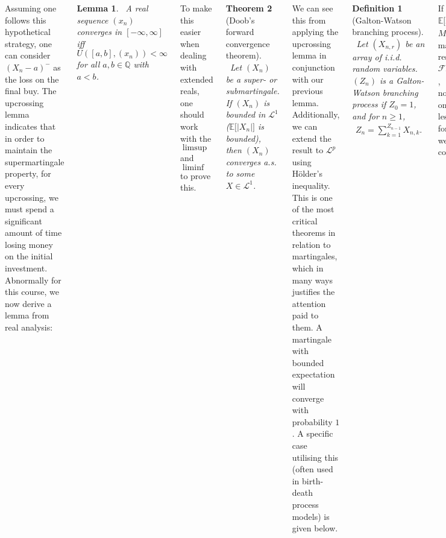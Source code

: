 \documentclass{tikzposter} %
\newtheorem{theorem}{Theorem}
\newtheorem{lemma}[theorem]{Lemma}
\newtheorem{definition}{Definition}
\begin{document}
\begin{columns}
{    Assuming one follows this hypothetical strategy, one can consider $(X_{n}-a)^{-}$ as the loss on the final buy. The upcrossing lemma indicates that in order to maintain the supermartingale property, for every upcrossing, we must spend a significant amount of time losing money on the initial investment. \\

    Abnormally for this course, we now derive a lemma from real analysis:
    \begin{lemma}
    \ A real sequence $(x_{n})$ converges in $[-\infty,\infty]$ iff $U([a,b],(x_{n})) < \infty$ for all $a,b \in \mathbb{Q}$ with $a < b$.
    \end{lemma}
    \hphantom{}

    To make this easier when dealing with extended reals, one should work with the $\limsup$ and $\liminf$ to prove this. \\

    \begin{theorem}[Doob's forward convergence theorem]
    \ Let $(X_{n})$ be a super- or submartingale. If $(X_{n})$ is bounded in $\mathcal{L}^{1}$ ($\mathbb{E}\big[|X_{n}|\big]$ is bounded), then $(X_{n})$ converges a.s. to some $X \in \mathcal{L}^{1}$.
    \end{theorem}
    \hphantom{}

    We can see this from applying the upcrossing lemma in conjunction with our previous lemma. Additionally, we can extend the result to $\mathcal{L}^{p}$ using H\"{o}lder's inequality. \\

    This is one of the most critical theorems in relation to martingales, which in many ways justifies the attention paid to them. A martingale with bounded expectation will converge with probability $1$. A specific case utilising this (often used in birth-death process models) is given below. \\

    \begin{definition}[Galton-Watson branching process]
    \ Let $(X_{n,r})$ be an array of i.i.d. random variables. $(Z_{n})$ is a Galton-Watson branching process if $Z_{0} = 1$, and for $n \ge 1$,
    \begin{align*}
      Z_{n} = \sum_{k=1}^{Z_{n-1}} X_{n,k}.
    \end{align*}
    \end{definition}
    \hphantom{}

    If each $X_{n,r}$ is integrable, and $\mathbb{E}\big[X_{0,0}\big] = \mu \neq 0$, we can write $M_{n} = Z_{n}/\mu^{n}$ to get a martingale $(M_{n})$ with respect to $\mathcal{F}_{n} = \sigma(\{X_{k,r} : r \ge 1,\, k \le n\})$, $(Z_{n})$ a sub-, super-, or normal martingale depending on whether $\mu$ is greater than, less than, or equal to $1$. By the forward-convergence theorem, we see that $(Z_{n})$ can either converge or blow up. \\

}
\end{columns}
\end{document}
